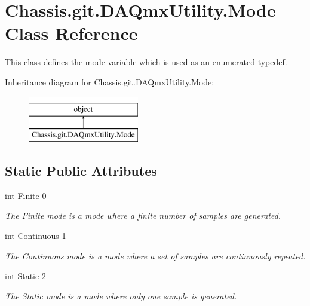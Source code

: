 \hypertarget{class_chassis_8git_1_1_d_a_qmx_utility_1_1_mode}{\section{Chassis.\-git.\-D\-A\-Qmx\-Utility.\-Mode Class Reference}
\label{class_chassis_8git_1_1_d_a_qmx_utility_1_1_mode}
}


This class defines the mode variable which is used as an enumerated typedef.  


Inheritance diagram for Chassis.\-git.\-D\-A\-Qmx\-Utility.\-Mode\-:\begin{figure}[H]
\begin{center}
\leavevmode
\includegraphics[height=2.000000cm]{class_chassis_8git_1_1_d_a_qmx_utility_1_1_mode}
\end{center}
\end{figure}
\subsection*{Static Public Attributes}
\begin{DoxyCompactItemize}
\item 
int \hyperlink{class_chassis_8git_1_1_d_a_qmx_utility_1_1_mode_a5f80bc9368631cb74ab852b829668b20}{Finite} 0
\begin{DoxyCompactList}\small\item\em The Finite mode is a mode where a finite number of samples are generated. \end{DoxyCompactList}\item 
int \hyperlink{class_chassis_8git_1_1_d_a_qmx_utility_1_1_mode_afe15b7dc045cfbb757f22256762f40cd}{Continuous} 1
\begin{DoxyCompactList}\small\item\em The Continuous mode is a mode where a set of samples are continuously repeated. \end{DoxyCompactList}\item 
int \hyperlink{class_chassis_8git_1_1_d_a_qmx_utility_1_1_mode_a756d944f9ac18e990a1d090873c23da7}{Static} 2
\begin{DoxyCompactList}\small\item\em The Static mode is a mode where only one sample is generated. \end{DoxyCompactList}\end{DoxyCompactItemize}


